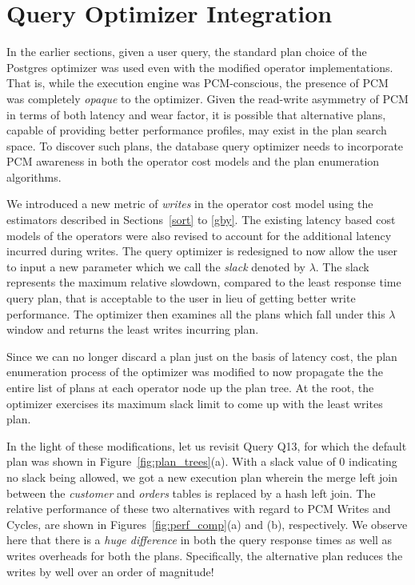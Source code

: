 \section{Query Optimizer Integration}
\label{discussion}

In the earlier sections, given a user query, the standard plan choice
of the Postgres optimizer was used even with the modified operator
implementations. That is, while the execution engine was PCM-conscious,
the presence of PCM was completely \emph{opaque} to the optimizer.
Given the read-write asymmetry of PCM in terms of both latency and wear
factor, it is possible that alternative plans, capable of providing better
performance profiles, may exist in the plan search space.  To discover
such plans, the database query optimizer needs to incorporate PCM
awareness in both the operator cost models and the plan enumeration
algorithms.

We introduced a new metric of \emph{writes} in the operator cost model using the estimators described in Sections~\ref{sort} to \ref{gby}. The existing latency based cost models of the operators were also revised to account for the additional latency incurred during writes. The query optimizer is redesigned to now allow the user to input a new parameter which we call the \emph{slack} denoted by $\lambda$. The slack represents the maximum relative slowdown, compared to the least response time query plan, that is acceptable to the user in lieu of getting better write performance. The optimizer then examines all the plans which fall under this $\lambda$ window and returns the least writes incurring plan.

Since we can no longer discard a plan just on the basis of latency cost, the plan enumeration process of the optimizer was modified to now propagate the the entire list of plans at each operator node up the plan tree. At the root, the optimizer exercises its maximum slack limit to come up with the least writes plan.

In the light of these modifications, let
us revisit Query Q13, for which the default plan was shown in
Figure~\ref{fig:plan_trees}(a). With a slack value of 0 indicating no slack being allowed, we got a new execution plan wherein the
merge left join between the \textit{customer} and \textit{orders}
tables is replaced by a hash left join.  The relative performance of
these two alternatives with regard to PCM Writes and Cycles, are shown
in Figures~\ref{fig:perf_comp}(a) and (b), respectively. We observe
here that there is a \emph{huge difference} in both the query response times as well as writes overheads for both the plans.
Specifically, the alternative plan reduces the writes by well over an
order of magnitude!


